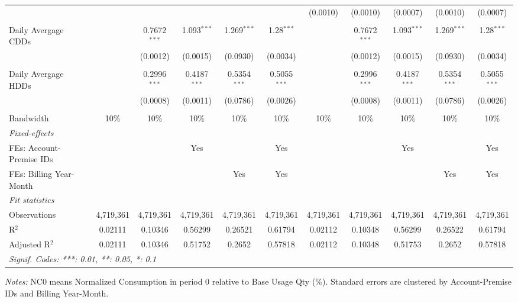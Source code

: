 \begin{table}[htbp]
\begin{adjustbox}{scale = 0.7}
\begin{tabular}{lcccccccccc}
  &   &    &    &    &    & (0.0010) & (0.0010) & (0.0007) & (0.0010) & (0.0007)\\
&   &   &   &   &   &   &   &   &   &  \\
Daily Avergage CDDs&   & 0.7672$^{***}$ & 1.093$^{***}$ & 1.269$^{***}$ & 1.28$^{***}$ &    & 0.7672$^{***}$ & 1.093$^{***}$ & 1.269$^{***}$ & 1.28$^{***}$\\
  &   & (0.0012) & (0.0015) & (0.0930) & (0.0034) &    & (0.0012) & (0.0015) & (0.0930) & (0.0034)\\
&   &   &   &   &   &   &   &   &   &  \\
Daily Avergage HDDs&   & 0.2996$^{***}$ & 0.4187$^{***}$ & 0.5354$^{***}$ & 0.5055$^{***}$ &    & 0.2996$^{***}$ & 0.4187$^{***}$ & 0.5354$^{***}$ & 0.5055$^{***}$\\
  &   & (0.0008) & (0.0011) & (0.0786) & (0.0026) &    & (0.0008) & (0.0011) & (0.0786) & (0.0026)\\
&   &   &   &   &   &   &   &   &   &  \\
\midrule Bandwidth & 10\% & 10\% & 10\% & 10\% & 10\% & 10\% & 10\% & 10\% & 10\% & 10\%\\
\midrule
\emph{Fixed-effects}&   &   &   &   &   &   &   &   &   &  \\
FEs: Account-Premise IDs &  &  & Yes &  & Yes &  &  & Yes &  & Yes\\
FEs: Billing Year-Month &  &  &  & Yes & Yes &  &  &  & Yes & Yes\\
\midrule
\emph{Fit statistics}&  & & & & & & & & & \\
Observations & 4,719,361&4,719,361&4,719,361&4,719,361&4,719,361&4,719,361&4,719,361&4,719,361&4,719,361&4,719,361\\
R$^2$ & 0.02111&0.10346&0.56299&0.26521&0.61794&0.02112&0.10348&0.56299&0.26522&0.61794\\
Adjusted R$^2$ & 0.02111&0.10346&0.51752&0.2652&0.57818&0.02112&0.10348&0.51753&0.2652&0.57818\\
\bottomrule\bottomrule
\multicolumn{11}{l}{\emph{Signif. Codes: ***: 0.01, **: 0.05, *: 0.1}}\\
\end{tabular}
\end{adjustbox}
\begin{tablenotes}
\footnotesize
\emph{\medskip Notes:} NC0 means Normalized Consumption in period 0 relative to Base Usage Qty (\%). Standard errors are clustered by Account-Premise IDs and Billing Year-Month.
\end{tablenotes}
\end{table}